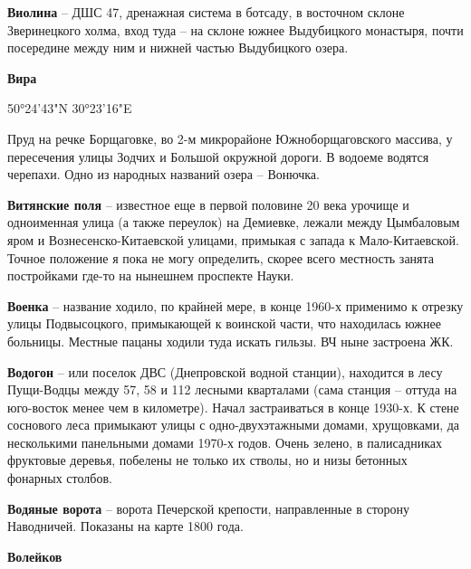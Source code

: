\medskip

\textbf{Виолина} – ДШС 47, дренажная система в ботсаду, в восточном склоне Зверинецкого холма, вход туда – на склоне южнее Выдубицкого монастыря, почти посередине между ним и нижней частью Выдубицкого озера.\\

\medskip

\textbf{Вира} 

50°24'43"N 30°23'16"E

Пруд на речке Борщаговке, во 2-м микрорайоне Южноборщаговского массива, у пересечения улицы Зодчих и Большой окружной дороги. В водоеме водятся черепахи. Одно из народных названий озера – Вонючка.\\

\medskip

\textbf{Витянские поля} – известное еще в первой половине 20 века урочище и одноименная улица (а также переулок) на Демиевке, лежали между Цымбаловым яром и Вознесенско-Китаевской улицами, примыкая с запада к Ма\-ло-Китаевской. Точное положение я пока не могу определить, скорее всего местность занята постройками где-то на нынешнем проспекте Науки.\\

\medskip

\textbf{Военка} – название ходило, по крайней мере, в конце 1960-х применимо к отрезку улицы Подвысоцкого, примыкающей к воинской части, что находилась южнее больницы. Местные пацаны ходили туда искать гильзы. ВЧ ныне застроена ЖК.\\ 

\medskip

\textbf{Водогон} – или поселок ДВС (Днепровской водной станции), находится в лесу Пущи-Вод\-цы между 57, 58 и 112 лесными кварталами (сама станция – оттуда на юго-восток менее чем в километре). Начал застраиваться в конце 1930-х. К стене соснового леса примыкают улицы с одно-двухэтажными домами, хрущовками, да несколькими панельными домами 1970-х годов. Очень зелено, в палисадниках фруктовые деревья, побелены не только их стволы, но и низы бетонных фонарных столбов.\\

\medskip

\textbf{Водяные ворота} – ворота Печерской крепости, направленные в сторону Наводничей. Показаны на карте 1800 года.\\

\medskip

\textbf{Волейков}

